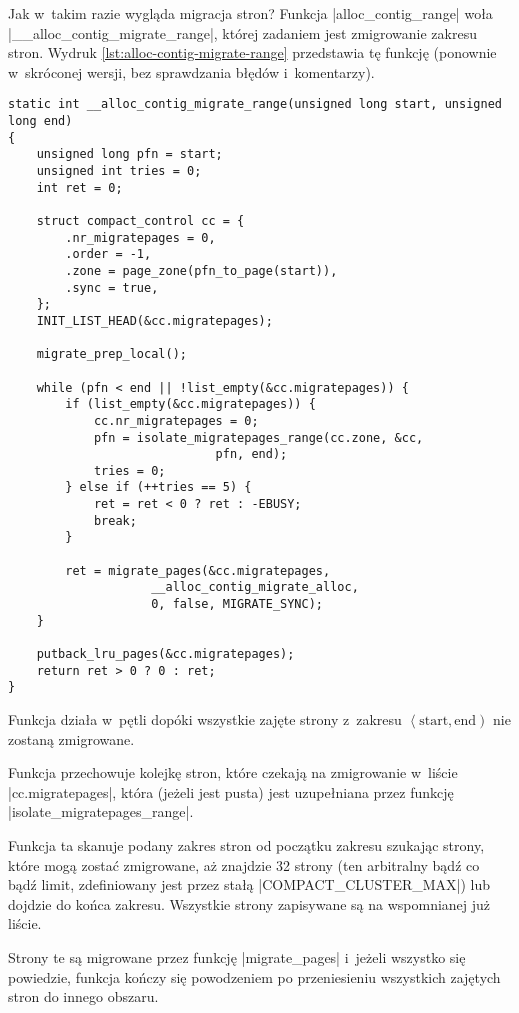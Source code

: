 Jak w~takim razie wygląda migracja stron?  Funkcja
\code|alloc_contig_range| woła \code|__alloc_contig_migrate_range|,
której zadaniem jest zmigrowanie zakresu stron.  Wydruk
\ref{lst:alloc-contig-migrate-range} przedstawia tę funkcję (ponownie
w~skróconej wersji, bez sprawdzania błędów i~komentarzy).

\begin{lstlisting}[float=tbhp,caption={Skrócony wydruk funkcji
    \code|__alloc_conting_migrate_range| z Linuksa 3.5.},label=lst:alloc-contig-migrate-range]
static int __alloc_contig_migrate_range(unsigned long start, unsigned long end)
{
	unsigned long pfn = start;
	unsigned int tries = 0;
	int ret = 0;

	struct compact_control cc = {
		.nr_migratepages = 0,
		.order = -1,
		.zone = page_zone(pfn_to_page(start)),
		.sync = true,
	};
	INIT_LIST_HEAD(&cc.migratepages);

	migrate_prep_local();

	while (pfn < end || !list_empty(&cc.migratepages)) {
		if (list_empty(&cc.migratepages)) {
			cc.nr_migratepages = 0;
			pfn = isolate_migratepages_range(cc.zone, &cc,
							 pfn, end);
			tries = 0;
		} else if (++tries == 5) {
			ret = ret < 0 ? ret : -EBUSY;
			break;
		}

		ret = migrate_pages(&cc.migratepages,
				    __alloc_contig_migrate_alloc,
				    0, false, MIGRATE_SYNC);
	}

	putback_lru_pages(&cc.migratepages);
	return ret > 0 ? 0 : ret;
}
\end{lstlisting}

Funkcja działa w~pętli dopóki wszystkie zajęte strony z~zakresu
$\left<\mathrm{start}, \mathrm{end}\right)$ nie zostaną zmigrowane.

Funkcja przechowuje kolejkę stron, które czekają na zmigrowanie
w~liście \code|cc.migratepages|, która (jeżeli jest pusta) jest
uzupełniana przez funkcję \code|isolate_migratepages_range|.

Funkcja ta skanuje podany zakres stron od początku zakresu szukając
strony, które mogą zostać zmigrowane, aż znajdzie 32 strony (ten
arbitralny bądź co bądź limit, zdefiniowany jest przez stałą
\code|COMPACT_CLUSTER_MAX|) lub dojdzie do końca zakresu.
Wszystkie strony zapisywane są na wspomnianej już liście.

Strony te są migrowane przez funkcję \code|migrate_pages|
i~jeżeli wszystko się powiedzie, funkcja kończy się powodzeniem po
przeniesieniu wszystkich zajętych stron do innego obszaru.


